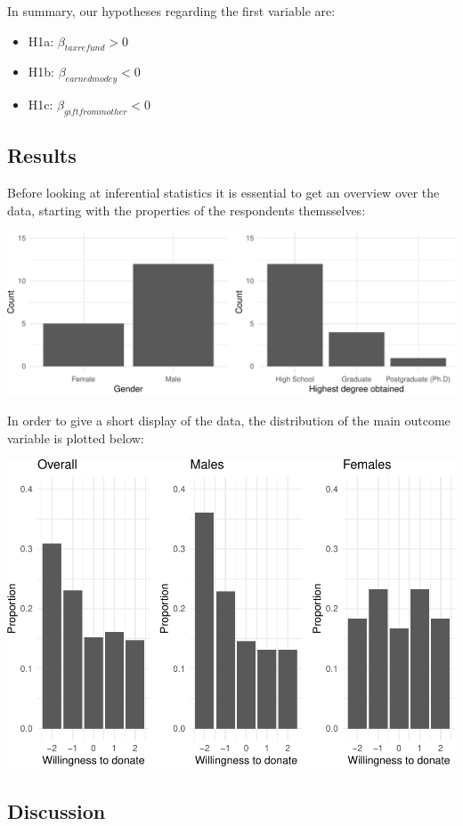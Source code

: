 \documentclass[12pt,]{article}
\providecommand{\tightlist}{%
  \setlength{\itemsep}{0pt}\setlength{\parskip}{0pt}}
\begin{document}
In summary, our hypotheses regarding the first variable are:

\begin{itemize}
\tightlist
\item
  H1a: \(\beta_{taxrefund} > 0\)
\item
  H1b: \(\beta_{earnedmodey} < 0\)
\item
  H1c: \(\beta_{giftfrommother} < 0\)
\end{itemize}

\hypertarget{results}{%
\subsection{Results}\label{results}}

Before looking at inferential statistics it is essential to get an
overview over the data, starting with the properties of the respondents
themsselves:

\includegraphics[width=1.05\linewidth]{FSE_paper_files/figure-latex/unnamed-chunk-2-1}

In order to give a short display of the data, the distribution of the
main outcome variable is plotted below:

\includegraphics{FSE_paper_files/figure-latex/plotting_proportions-1.pdf}

\hypertarget{discussion}{%
\subsection{Discussion}\label{discussion}}
\end{document}
